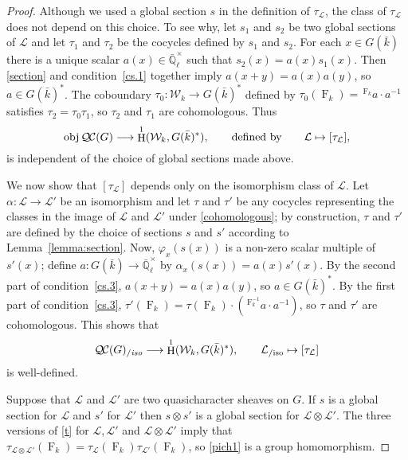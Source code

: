\documentclass[11pt]{amsart}
\theoremstyle{plain}
\theoremstyle{definition}
\theoremstyle{remark}
\newcommand{\EE}{\mathbb{\bar Q}_\ell}
\newcommand{\bFq}{\bar{k}}
\newcommand{\Fq}{k}
\newcommand{\EEx}{\EE^\times}
\newcommand{\Frob}[1]{\operatorname{F}_{#1}}
\DeclareMathOperator{\Hh}{H}
\newcommand{\obj}{{\text{obj}\, }}
\newcommand{\qcs}[1]{{\mathcal{#1}}}
\newcommand{\QC}{{\mathcal{Q\hskip-0.8pt C}}}
\newcommand{\QCiso}[1]{\QC(#1)_{/\textit{iso}}}
\newcommand{\Weil}[1]{\mathcal{W}_{#1}}
\newcommand\Clifton[1]{\marginpar{\smaller\smaller CC: #1}}
\begin{document}
\begin{proof}
  Although we used a global section $s$ in the definition of
  $\tau_\qcs{L}$, the class of $\tau_\qcs{L}$ does not depend on this
  choice. To see why, let $s_1$ and $s_2$ be two global sections of
  $\qcs{L}$ and let $\tau_1$ and $\tau_2$ be the cocycles defined by $s_1$ and $s_2$.
  For each $x \in G(\bFq)$ there is a unique scalar
  $a(x) \in \EEx$ such that $s_2(x) = a(x) s_1(x)$. Then \eqref{section} and
  condition~\ref{cs.1} together imply $a(x+y) = a(x)a(y)$, so
  $a\in G(\bFq)^*$.  The coboundary $\tau_0 : \Weil{\Fq} \to G(\bFq)^*$
  defined by $\tau_0(\Frob{\Fq}) = \,^{\Frob{\Fq}} a \cdot a^{-1}$ satisfies $\tau_2 = \tau_0 \tau_1$,
  so $\tau_2$ and $\tau_1$ are cohomologous. Thus
  \begin{equation}\label{cohomologous}
    \obj \QC(G) \longrightarrow \Hh^1(\Weil{\Fq},G(\bFq)^*),
    \qquad \text{defined by} \qquad \qcs{L} \mapsto [\tau_\qcs{L}],
  \end{equation}
  is independent of the choice of global sections made above.

  We now show that $[\tau_\qcs{L}]$ depends only on the isomorphism class of $\qcs{L}$.
  Let $\alpha : \qcs{L} \to \qcs{L'}$ be an isomorphism and
  let $\tau$ and $\tau'$ be any cocycles representing the classes in the
  image of $\qcs{L}$ and $\qcs{L'}$ under \eqref{cohomologous}; by construction,
  $\tau$ and $\tau'$ are defined by the choice of sections $s$ and $s'$ 
  according to Lemma~\ref{lemma:section}.
    Now, $\varphi_x(s(x))$ is a
  non-zero scalar multiple of $s'(x)$; define $a: G(\bFq) \to \EEx$
  by $\alpha_x(s(x)) = a(x) s'(x)$.
  By the second part of condition~\ref{cs.3},
  $a(x+y) = a(x)a(y)$, so $a \in G(\bFq)^*$. By the first part of
  condition~\ref{cs.3}, $\tau'(\Frob{\Fq}) = \tau(\Frob{\Fq}) \cdot (\,^{\Frob{\Fq}^{-1}}a \cdot a^{-1})$,
  \Clifton{Fix this.}
  so $\tau$ and $\tau'$ are cohomologous. This shows that
  \begin{equation}\label{pich1}
    \QCiso{G} \longrightarrow \Hh^1(\Weil{\Fq},G(\bFq)^*), \qquad \qcs{L}_{/\text{iso}} \mapsto [\tau_\qcs{L}]
  \end{equation}
  is well-defined.
  
    Suppose that $\qcs{L}$ and $\qcs{L}'$ are two quasicharacter sheaves on $G$.
  If $s$ is a global section for $\qcs{L}$ and $s'$ for $\qcs{L}'$ then $s \otimes s'$
  is a global section for $\qcs{L} \otimes\qcs{L}'$.  The three versions of \eqref{t}
  for $\qcs{L}, \qcs{L'}$ and $\qcs{L} \otimes\qcs{L}'$ imply that
  $\tau_{\qcs{L} \otimes\qcs{L}'}(\Frob{k}) = \tau_\qcs{L}(\Frob{k}) \tau_{\qcs{L}'}(\Frob{k})$,
  so \eqref{pich1} is a group homomorphism.
 

\end{proof}
\end{document}
